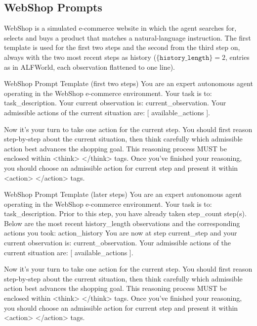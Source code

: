 \subsection{WebShop Prompts}
\label{app:prompt-webshop}

WebShop is a simulated e-commerce website in which the agent searches for, selects and buys a product
that matches a natural-language instruction. The first template is used for the first two steps and
the second from the third step on, always with the two most recent steps as history
($\texttt{\{history\_length\}}=2$, entries as in ALFWorld, each observation flattened to one line).

\begin{promptbox}{WebShop Prompt Template (first two steps)}
You are an expert autonomous agent operating in the WebShop e-commerce environment.
Your task is to: {task_description}.
Your current observation is: {current_observation}.
Your admissible actions of the current situation are:
[
{available_actions}
].

Now it's your turn to take one action for the current step.
You should first reason step-by-step about the current situation, then think carefully which admissible action best advances the shopping goal. This reasoning process MUST be enclosed within <think> </think> tags.
Once you've finished your reasoning, you should choose an admissible action for current step and present it within <action> </action> tags.
\end{promptbox}

\begin{promptbox}{WebShop Prompt Template (later steps)}
You are an expert autonomous agent operating in the WebShop e-commerce environment.
Your task is to: {task_description}.
Prior to this step, you have already taken {step_count} step(s). Below are the most recent {history_length} observations and the corresponding actions you took: {action_history}
You are now at step {current_step} and your current observation is: {current_observation}.
Your admissible actions of the current situation are:
[
{available_actions}
].

Now it's your turn to take one action for the current step.
You should first reason step-by-step about the current situation, then think carefully which admissible action best advances the shopping goal. This reasoning process MUST be enclosed within <think> </think> tags.
Once you've finished your reasoning, you should choose an admissible action for current step and present it within <action> </action> tags.
\end{promptbox}

